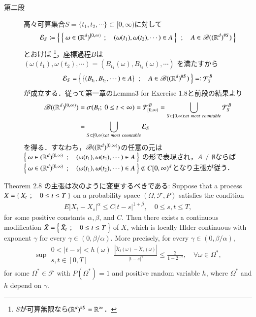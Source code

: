\begin{prf}
\begin{description}
			\item[第二段]
				高々可算集合$S = \{t_1,t_2,\cdots\} \subset [0,\infty)$に対して
				\begin{align}
					\mathcal{E}_S \coloneqq \left\{\ \left\{\ \omega \in (\mathbb{R}^d)^{[0,\infty)}\ \, ; \quad (\omega(t_1),\omega(t_2),\cdots) \in A\ \right\}\ \, ; \quad A \in \mathscr{B}((\mathbb{R}^d)^{\# S})\ \right\}
				\end{align}
				とおけば
				\footnote{
					$S$が可算無限なら$(\mathbb{R}^d)^{\# S} = \mathbb{R}^\infty$．
				}，座標過程$B$は
				$(\omega(t_1),\omega(t_2),\cdots) = (B_{t_1}(\omega),B_{t_2}(\omega),\cdots)$
				を満たすから
				\begin{align}
					\mathcal{E}_S = \left\{\ \left\{(B_{t_1},B_{t_2},\cdots) \in A\right\}\ \, ; \quad A \in \mathscr{B}((\mathbb{R}^d)^{\# S})\ \right\} =\mathrel{\mathop:} \mathcal{F}^B_S
				\end{align}
				が成立する．従って第一章のLemma3 for Exercise 1.8と前段の結果より
				\begin{align}
					\borel{(\R^d)^{[0,\infty)}}
					&= \sigma(B_t;\ 0 \leq t < \infty)
					= \mathcal{F}^B_{[0,\infty)}
					= \bigcup_{S \subset [0,\infty):at\ most\ countable} \mathcal{F}^B_S\\
					&= \bigcup_{S \subset [0,\infty):at\ most\ countable} \mathcal{E}_S
				\end{align}
				を得る．すなわち，$\mathscr{B}((\mathbb{R}^d)^{[0,\infty)})$の任意の元は
				$\left\{\ \omega \in (\mathbb{R}^d)^{[0,\infty)}\ \, ; \quad (\omega(t_1),\omega(t_2),\cdots) \in A\ \right\}$
				の形で表現され，$A \neq \emptyset$ならば
				$\left\{\ \omega \in (\mathbb{R}^d)^{[0,\infty)}\ \, ; \quad (\omega(t_1),\omega(t_2),\cdots) \in A\ \right\} \not\subset C[0,\infty)^d$となり主張が従う．
				\QED
		\end{description}
	\end{prf}
	
	\begin{itembox}[l]{Theorem 2.8 の主張は次のように変更するべきである:}
		Suppose that a process $X = \left\{\ X_t\ \, ; \quad 0 \leq t \leq T\ \right\}$ on a probability space 
		$(\Omega,\mathscr{F},P)$ satisfies the condition
		\begin{align}
			E|X_t - X_s|^\alpha \leq C|t-s|^{1 + \beta},
			\quad 0 \leq s,t \leq T,
		\end{align}
		for some positive constants $\alpha,\beta$, and $C$. Then there exists a 
		continuous modification $\tilde{X} = \left\{\ \tilde{X}_t\ \, ; \quad 0 \leq t \leq T\ \right\}$ of $X$, 
		which is locally Hlder-continuous with exponent $\gamma$ for every 
		$\gamma \in (0,\beta/\alpha)$. More precisely, for every $\gamma \in (0,\beta/\alpha)$,
		\begin{align}
			\sup{\substack{0 < |t-s| < h(\omega) \\ s,t \in [0,T]}}{\frac{\left| \tilde{X}_t(\omega) - \tilde{X}_s(\omega) \right|}{|t-s|^\gamma}} \leq \frac{2}{1-2^{-\gamma}},
			\quad \forall \omega \in \Omega^*,
		\end{align}
		for some $\Omega^* \in \mathscr{F}$ with $P(\Omega^*)=1$ and 
		positive random variable $h$, where $\Omega^*$ and $h$ depend on $\gamma$.
	\end{itembox}
	
